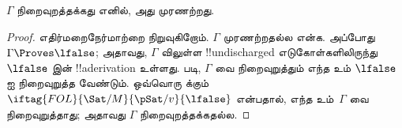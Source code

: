 \documentclass[../../../include/open-logic-section]{subfiles}
\begin{document}
\begin{cor}
$\Gamma$ நிறைவுறத்தக்கது எனில், அது முரணற்றது.
\end{cor}

\begin{proof}
எதிர்மறைநேர்மாற்றை நிறுவுகிறோம். $\Gamma$ முரணற்றதல்ல என்க. அப்போது
$\Gamma \Proves \lfalse$; அதாவது, $\Gamma$ விலுள்ள !!{undischarged}
எடுகோள்களிலிருந்து $\lfalse$ இன் !!a{derivation} உள்ளது.
 படி, $\Gamma$ வை நிறைவுறுத்தும் எந்த
 உம்
$\lfalse$ ஐ நிறைவுறுத்த வேண்டும். ஒவ்வொரு
 க்கும்
$\iftag{FOL}{\Sat/{M}}{\pSat/{v}}{\lfalse}$ என்பதால், எந்த
 உம்~$\Gamma$ வை நிறைவுறுத்தாது;
அதாவது $\Gamma$ நிறைவுறத்தக்கதல்ல.
\end{proof}
\end{document}
